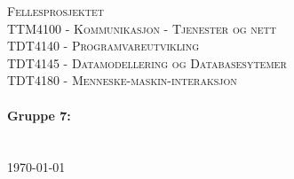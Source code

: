 \begin{titlepage}
\begin{center} 

\vspace*{3cm}
\textsc{\Huge Fellesprosjektet}\\[0.7cm]
\textsc{\LARGE TTM4100 - Kommunikasjon - Tjenester og nett}\\[0.2cm]
\textsc{\LARGE TDT4140 - Programvareutvikling}\\[0.2cm]
\textsc{\LARGE TDT4145 - Datamodellering og Databasesytemer}\\[0.2cm]
\textsc{\LARGE TDT4180 - Menneske-maskin-interaksjon}\\[0.2cm]
\\[1.6cm]

\textbf{\Large Gruppe 7:} \\[0.2cm]
 \\
\\[1cm] 

\today

\end{center}
\end{titlepage}
